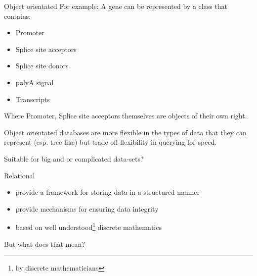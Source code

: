 \documentclass[pdf]{beamer}
\begin{document}
\begin{frame}{Object orientated}
  For example: A gene can be represented by a class that contains:
  \begin{itemize}
  \item Promoter
  \item Splice site acceptors
  \item Splice site donors
  \item polyA signal
  \item Transcripts
  \end{itemize}
  
  Where Promoter, Splice site acceptors themselves are objects of their own right.
  
  Object orientated databases are more flexible in the types of data
  that they can represent (esp. tree like) but trade off flexibility
  in querying for speed.

  Suitable for big and or complicated data-sets?
\end{frame}

\begin{frame}{Relational}
  \begin{itemize}
  \item provide a framework for storing data in a structured manner
  \item provide mechanisms for ensuring data integrity
  \item based on well understood\footnote{by discrete mathematicians} discrete mathematics
  \end{itemize}
  \pause
  But what does that mean?
\end{frame}
\end{document}
